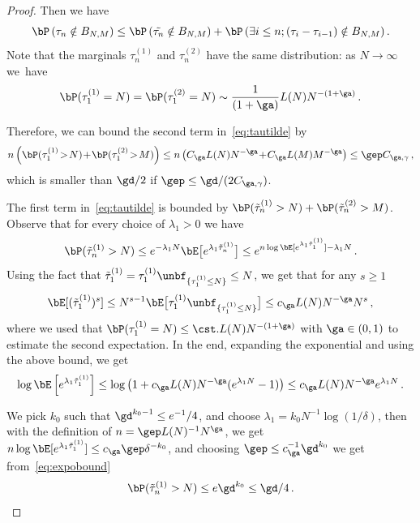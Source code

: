 \begin{appendix}
\begin{proof}
Then we have
\begin{equation}\label{eq:tautilde}
\bP \left(\tau_n \notin B_{N,M} \right) \le \bP \left(\tilde{\tau_n} \notin B_{N,M} \right) + \bP \left(\exists i \le n ; (\tau_i - \tau_{i-1}) \notin B_{N,M} \right).
\end{equation}
Note that the marginals $\tau^{(1)}_n$ and $\tau^{(2)}_n$ have the same distribution: as $N \to \infty$ we~have
\begin{equation}
\bP(\tau^{(1)}_1= N) = \bP(\tau^{(2)}_1= N) \sim \frac{1}{(1+\ga)} L(N) N^{-(1+ \ga)}\,.
\end{equation}

Therefore, we can bound the second term in~\eqref{eq:tautilde} by
\begin{equation}
n \left(\bP (\tau^{(1)}_1 \!>\! N)\!+\! \bP (\tau^{(2)}_1 \!>\! M) \right) \le n \left(C_{\ga} L(N) N^{-\ga} \!+\!C_{\ga} L(M) M^{-\ga}\right) \le \gep C_{\ga,\gamma}\,,
\end{equation}
which is smaller than $\gd/2$ if $\gep \leq \gd/(2 C_{\ga,\gamma})$.

The first term in~\eqref{eq:tautilde} is bounded by $ \bP(\tilde{\tau}^{(1)}_n > N) + \bP(\tilde{\tau}^{(2)}_n > M)$. Observe that for every choice of $\lambda_1 >0$ we have
\begin{equation}
\bP (\tilde{\tau}^{(1)}_n > N) \le e^{ -\lambda_1 N} \bE \big[e^{\lambda_1 \tilde{\tau}^{(1)}_n}\big]
\le e^{n \log \bE[e^{\lambda_1 \tilde{\tau}^{(1)}_1}] - \lambda_1 N }\,.\label{eq:expobound}
\end{equation}
Using the fact that $\tilde \tau_1^{(1)} = \tau_1^{(1)} \unbf_{\{\tau_1^{(1)}\leq N \}}\leq N$, we get that for any $s \ge 1$
\begin{equation}
\bE [(\tilde{\tau}^{(1)}_1)^s] \le N^{s-1}
\bE \big[\tau^{(1)}_1 \unbf_{\{\tau^{(1)}_1 \leq N\}}\big] \le c_{\ga} L(N) N^{- \ga } N^s\,,
\end{equation}
where we used that $\bP(\tau_1^{(1)} =N) \leq \cst. L(N) N^{-(1+\ga)}$ with $\ga\in(0,1)$ to estimate the second expectation. In the end, expanding the exponential and using the above bound, we get
\begin{equation}
\log \bE \left[e^{\lambda_1 \tilde{\tau}^{(1)}_1} \right] \le \log \left(1 + c_{\ga} L(N) N^{- \ga } (e^{\lambda_1 N} -1) \right) \le c_{\ga} L(N) N^{- \ga } e^{\lambda_1 N}\,.
\end{equation}

We pick $k_0$ such that $\gd^{k_0-1}\leq e^{-1}/4$, and choose $\lambda_1 = k_0 N^{-1} \log(1/ \delta)$, then with the definition of $n=\gep L(N)^{-1} N^{\ga}$, we get $n \log \bE [e^{\lambda_1 \tilde{\tau}^{(1)}_1}] \le c_{\ga} \gep \delta^{-k_0} $, and choosing $\gep\leq c_{\ga}^{-1} \gd^{k_0}$ we get from~\eqref{eq:expobound}
\begin{equation}
\bP(\tilde{\tau}^{(1)}_n > N) \le e \gd^{k_0} \leq \gd/4\,.
\end{equation}


\end{proof}
\end{appendix}
